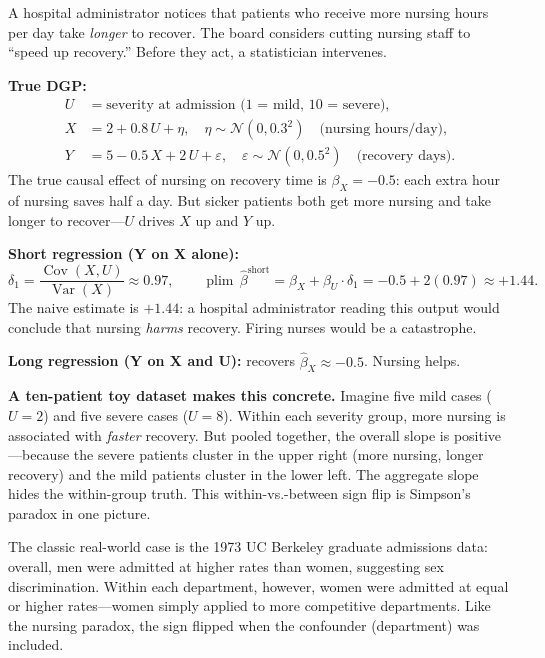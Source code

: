 \documentclass[11pt,a4paper]{article}
\theoremstyle{definition}
\theoremstyle{plain}
\theoremstyle{remark}
\newcommand{\Var}{\operatorname{Var}}
\newcommand{\Cov}{\operatorname{Cov}}
\newcommand{\plim}{\operatorname{plim}}
\newcommand{\bhat}{\hat{\beta}}
\begin{document}
\begin{numermark}[title={The Nursing Paradox}]
A hospital administrator notices that patients who receive more nursing hours per day take \emph{longer} to recover. The board considers cutting nursing staff to ``speed up recovery.'' Before they act, a statistician intervenes.

\textbf{True DGP:}
\begin{align*}
  U &= \text{severity at admission (1 = mild, 10 = severe)}, \\
  X &= 2 + 0.8\,U + \eta, \quad \eta \sim \mathcal{N}(0, 0.3^2) \quad \text{(nursing hours/day)}, \\
  Y &= 5 - 0.5\,X + 2\,U + \varepsilon, \quad \varepsilon \sim \mathcal{N}(0, 0.5^2) \quad \text{(recovery days)}.
\end{align*}
The true causal effect of nursing on recovery time is $\beta_X = -0.5$: each extra hour of nursing saves half a day. But sicker patients both get more nursing and take longer to recover---$U$ drives $X$ up and $Y$ up.

\textbf{Short regression (Y on X alone):}
\[
  \delta_1 = \frac{\Cov(X, U)}{\Var(X)} \approx 0.97, \qquad \plim\,\bhat^{\text{short}} = \beta_X + \beta_U \cdot \delta_1 = -0.5 + 2(0.97) \approx +1.44.
\]
The naive estimate is $+1.44$: a hospital administrator reading this output would conclude that nursing \emph{harms} recovery. Firing nurses would be a catastrophe.

\textbf{Long regression (Y on X and U):} recovers $\bhat_X \approx -0.5$. Nursing helps.

\textbf{A ten-patient toy dataset makes this concrete.} Imagine five mild cases ($U = 2$) and five severe cases ($U = 8$). Within each severity group, more nursing is associated with \emph{faster} recovery. But pooled together, the overall slope is positive---because the severe patients cluster in the upper right (more nursing, longer recovery) and the mild patients cluster in the lower left. The aggregate slope hides the within-group truth. This within-vs.-between sign flip is Simpson's paradox in one picture.
\end{numermark}

The classic real-world case is the 1973 UC Berkeley graduate admissions data: overall, men were admitted at higher rates than women, suggesting sex discrimination. Within each department, however, women were admitted at equal or higher rates---women simply applied to more competitive departments. Like the nursing paradox, the sign flipped when the confounder (department) was included.
\end{document}
